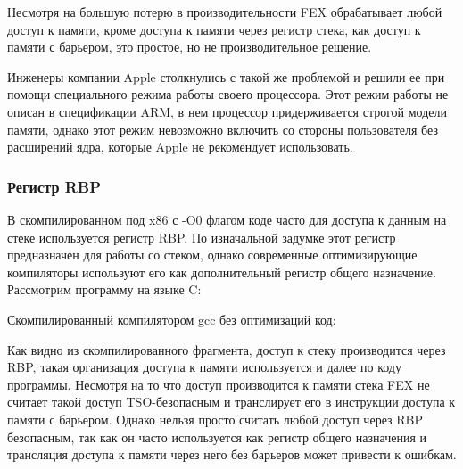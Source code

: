 Несмотря на большую потерю в производительности FEX обрабатывает любой доступ к памяти, кроме доступа к памяти через регистр стека, как доступ к памяти с барьером, это простое, но не производительное решение.

Инженеры компании Apple столкнулись с такой же проблемой и решили ее при помощи специального режима работы своего процессора. Этот режим работы не описан в спецификации ARM, в нем процессор придерживается строгой модели памяти, однако этот режим невозможно включить со стороны пользователя без расширений ядра, которые Apple не рекомендует использовать.

\subsubsection{Регистр RBP}

В скомпилированном под x86 с -O0 флагом коде часто для доступа к данным на стеке используется регистр RBP. По изначальной задумке этот регистр предназначен для работы со стеком, однако современные оптимизирующие компиляторы используют его как дополнительный регистр общего назначение. Рассмотрим программу на языке C:


Скомпилированный компилятором gcc без оптимизаций код:


Как видно из скомпилированного фрагмента, доступ к стеку производится через RBP, такая организация доступа к памяти используется и далее по коду программы. Несмотря на то что доступ производится к памяти стека FEX не считает такой доступ TSO-безопасным и транслирует его в инструкции доступа к памяти с барьером. Однако нельзя просто считать любой доступ через RBP безопасным, так как он часто используется как регистр общего назначения и трансляция доступа к памяти через него без барьеров может привести к ошибкам.

